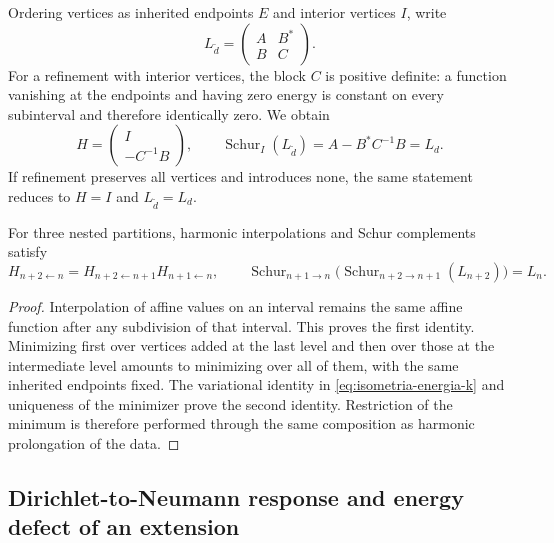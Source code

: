 Ordering vertices as inherited endpoints \(E\) and interior vertices
\(I\), write
\[
 L_{\widetilde d}=\begin{pmatrix}A&B^*\\B&C\end{pmatrix}.
\]
For a refinement with interior vertices, the block \(C\) is
positive definite: a function vanishing at the endpoints and having
zero energy is constant on every subinterval and therefore identically
zero. We obtain
\begin{equation}
 H=\begin{pmatrix}I\\-C^{-1}B\end{pmatrix},\qquad
 \operatorname{Schur}_{I}(L_{\widetilde d})
 =A-B^*C^{-1}B=L_d.
 \label{eq:schur-intervalar-k}
\end{equation}
If refinement preserves all vertices and introduces none, the same
statement reduces to \(H=I\) and \(L_{\widetilde d}=L_d\).

\begin{proposition}
\label{prop:energia-naturalidad-sucesiva}
For three nested partitions, harmonic interpolations and Schur
complements satisfy
\begin{equation}
 H_{n+2\leftarrow n}
 =H_{n+2\leftarrow n+1}H_{n+1\leftarrow n},
 \qquad
 \operatorname{Schur}_{n+1\to n}
 \bigl(\operatorname{Schur}_{n+2\to n+1}(L_{n+2})\bigr)=L_n.
 \label{eq:energia-naturalidad-sucesiva}
\end{equation}
\end{proposition}
\begin{proof}
Interpolation of affine values on an interval remains the same affine
function after any subdivision of that interval. This proves the
first identity. Minimizing first over vertices added at the last
level and then over those at the intermediate level amounts to
minimizing over all of them, with the same inherited endpoints fixed.
The variational identity in \eqref{eq:isometria-energia-k} and
uniqueness of the minimizer prove the second identity. Restriction
of the minimum is therefore performed through the same composition
as harmonic prolongation of the data.
\end{proof}

\subsection{Dirichlet-to-Neumann response and energy defect of an extension}

